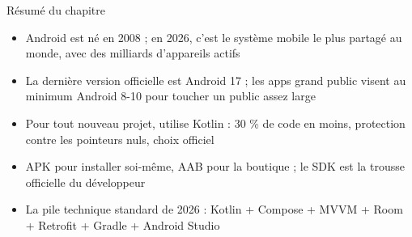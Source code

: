 \begin{tcbsummary}{Résumé du chapitre}
\begin{itemize}
  \item Android est né en 2008 ; en 2026, c'est le système mobile le plus partagé au monde, avec des milliards d'appareils actifs
  \item La dernière version officielle est Android 17 ; les apps grand public visent au minimum Android 8-10 pour toucher un public assez large
  \item Pour tout nouveau projet, utilise Kotlin : 30 \% de code en moins, protection contre les pointeurs nuls, choix officiel
  \item APK pour installer soi-même, AAB pour la boutique ; le SDK est la trousse officielle du développeur
  \item La pile technique standard de 2026 : Kotlin + Compose + MVVM + Room + Retrofit + Gradle + Android Studio
\end{itemize}

\end{tcbsummary}
